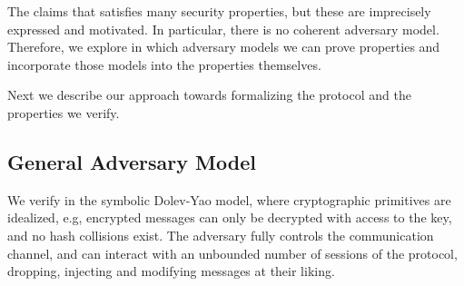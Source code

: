 The \mEdhoc{} \mSpec{} \cite{selander-lake-edhoc-01} claims
that \mEdhoc{} satisfies many security properties, but these are imprecisely
expressed and motivated.
%
In particular, there is no coherent adversary model.
%
Therefore, we explore in which adversary models we can prove properties and
incorporate those models into the properties themselves.
%

Next we describe our approach towards formalizing the \mEdhoc{} protocol and the
properties we verify.
%

\subsection{General Adversary Model}\label{sec:threat-model}
We verify \mEdhoc{} in the symbolic Dolev-Yao model, where
cryptographic primitives are idealized, e.g, encrypted messages can only be
decrypted with access to the key, and no hash collisions exist.
%
The adversary fully controls the
communication channel, and can interact with an unbounded number of sessions
of the protocol, dropping, injecting and modifying messages at their liking.
%

